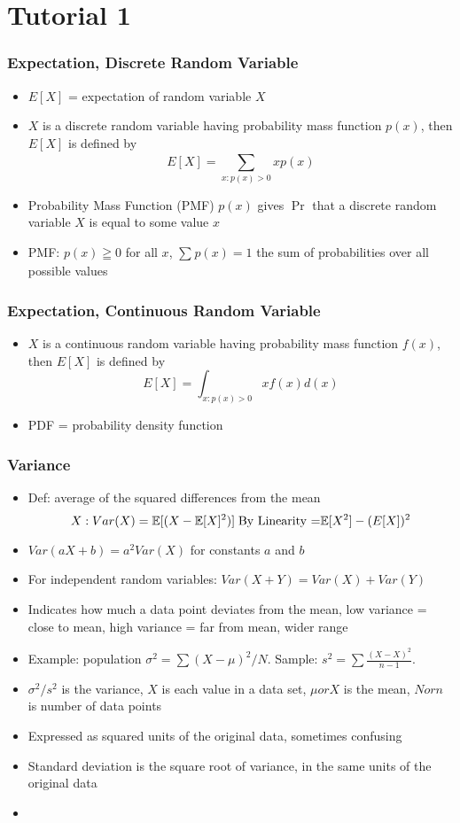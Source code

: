\section*{Tutorial 1}
\subsubsection*{Expectation, Discrete Random Variable}
\begin{itemize}
    \item $E[X]$ = expectation of random variable $X$
    \item $X$ is a discrete random variable having probability mass function $p(x)$, then $E[X]$ is defined by 
    \[
        E[X] = \sum_{x:p(x)>0}^{} xp(x)
    \]
    \item Probability Mass Function (PMF) $p(x)$ gives $\Pr$ that a discrete random variable $X$ is equal to some value $x$
    \item PMF: $p(x) \geqq 0$ for all $x$, $\sum_{}^{}p(x) = 1$ the sum of probabilities over all possible values
\end{itemize}
\subsubsection*{Expectation, Continuous Random Variable}
\begin{itemize}
    \item $X$ is a continuous random variable having probability mass function $f(x)$, then $E[X]$ is defined by 
    \[
        E[X] = \int_{x:p(x)>0}^{} xf(x)d(x)
    \]
    \item PDF = probability density function
\end{itemize}

\subsubsection*{Variance}
\begin{itemize}
    \item Def: average of the squared differences from the mean
           \[
                X: Var(X) = \mathbb{E}[(X-\mathbb{E}[X]^2)] \; \text{By Linearity =} \mathbb{E}[X^2] - (E[X])^2
            \]      
    \item $Var(aX + b) = a^2Var(X)$ for constants $a$ and $b$
    \item For independent random variables: $Var(X + Y) = Var(X) + Var(Y)$
    \item Indicates how much a data point deviates from the mean, low variance = close to mean, high variance = far from mean, wider range
    \item Example: population $\sigma^2 = \sum(X - \mu)^2 / N.$ Sample: $s^2 = \sum  \tfrac{(X - X)^2}{n-1}$.
    \item $\sigma^2 / s^2$ is the variance, $X$ is each value in a data set, $\mu or X$ is the mean, $N or n$ is number of data points 
    \item Expressed as squared units of the original data, sometimes confusing
    \item Standard deviation is the square root of variance, in the same units of the original data
    \item 
\end{itemize}

